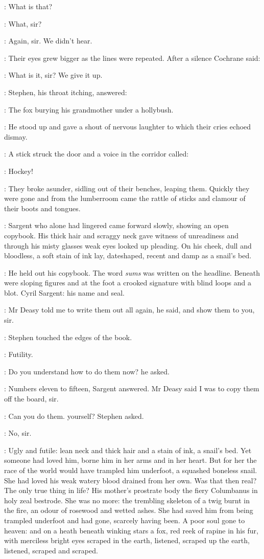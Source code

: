 \Stephen:
What is that?

\comyn:
What, sir?

\armstrong:
Again, sir. We didn't hear.

:
Their eyes grew bigger as the lines were repeated. After a silence
Cochrane said:

\cochrane:
What is it, sir? We give it up.

:
Stephen, his throat itching, answered:

\Stephen:
The fox burying his grandmother under a hollybush.

:
He stood up and gave a shout of nervous laughter to which their cries
echoed dismay.

:
A stick struck the door and a voice in the corridor called:

\voice:
Hockey!

:
They broke asunder, sidling out of their benches, leaping them.
Quickly they were gone and from the lumberroom came the rattle of sticks
and clamour of their boots and tongues.

:
Sargent who alone had lingered came forward slowly, showing an
open copybook. His thick hair and scraggy neck gave witness of
unreadiness and through his misty glasses weak eyes looked up pleading.
On his cheek, dull and bloodless, a soft stain of ink lay, dateshaped,
recent and damp as a snail's bed.


:
He held out his copybook. The word \emph{sums} was written on the
headline. Beneath were sloping figures and at the foot a crooked signature
with blind loops and a blot. Cyril Sargent: his name and seal.

\sargent:
Mr Deasy told me to write them out all again, he said, and show them to
you, sir.

:
Stephen touched the edges of the book.

\StephenInt:
Futility.

\Stephen:
Do you understand how to do them now? he asked.

\sargent:
Numbers eleven to fifteen, Sargent answered. Mr Deasy said I was to
copy them off the board, sir.

\Stephen:
Can you do them. yourself? Stephen asked.

\sargent:
No, sir.

\StephenInt:
Ugly and futile: lean neck and thick hair and a stain of ink, a snail's
bed. Yet someone had loved him, borne him in her arms and in her heart.
But for her the race of the world would have trampled him underfoot, a
squashed boneless snail. She had loved his weak watery blood drained from
her own. Was that then real? The only true thing in life? His mother's
prostrate body the fiery Columbanus in holy zeal bestrode. She was no
more: the trembling skeleton of a twig burnt in the fire, an odour of
rosewood and wetted ashes. She had saved him from being trampled
underfoot and had gone, scarcely having been. A poor soul gone to heaven:
and on a heath beneath winking stars a fox, red reek of rapine in his fur,
with merciless bright eyes scraped in the earth, listened, scraped up the
earth, listened, scraped and scraped.

